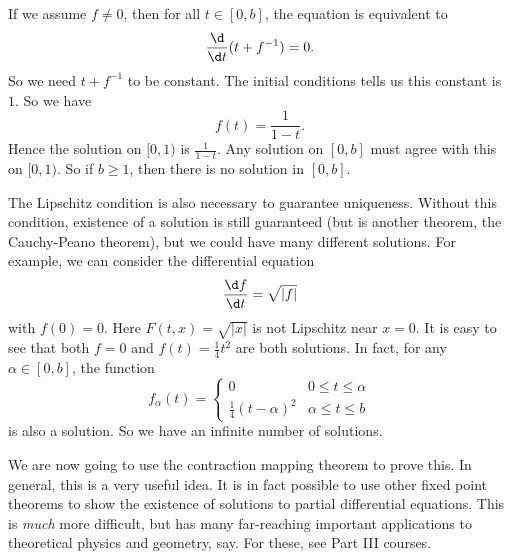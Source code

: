 \documentclass[a4paper]{article}
\begin{document}
If we assume $f \not= 0$, then for all $t \in [0, b]$, the equation is equivalent to
\[
  \frac{\d}{\d t}(t + f^{-1}) = 0.
\]
So we need $t + f^{-1}$ to be constant. The initial conditions tells us this constant is $1$. So we have
\[
  f(t) = \frac{1}{1 - t}.
\]
Hence the solution on $[0, 1)$ is $\frac{1}{1 - t}$. Any solution on $[0, b]$ must agree with this on $[0, 1)$. So if $b \geq 1$, then there is no solution in $[0, b]$.

The Lipschitz condition is also necessary to guarantee uniqueness. Without this condition, existence of a solution is still guaranteed (but is another theorem, the Cauchy-Peano theorem), but we could have many different solutions. For example, we can consider the differential equation
\[
  \frac{\d f}{\d t} = \sqrt{|f|}
\]
with $f(0) = 0$. Here $F(t, x) = \sqrt{|x|}$ is not Lipschitz near $x = 0$. It is easy to see that both $f = 0$ and $f(t) = \frac{1}{4}t^2$ are both solutions. In fact, for any $\alpha \in [0, b]$, the function
\[
  f_\alpha(t) =
  \begin{cases}
    0 & 0 \leq t \leq \alpha\\
    \frac{1}{4}(t - \alpha)^2 & \alpha \leq t \leq b
  \end{cases}
\]
is also a solution. So we have an infinite number of solutions.

We are now going to use the contraction mapping theorem to prove this. In general, this is a very useful idea. It is in fact possible to use other fixed point theorems to show the existence of solutions to partial differential equations. This is \emph{much} more difficult, but has many far-reaching important applications to theoretical physics and geometry, say. For these, see Part III courses.
\end{document}
